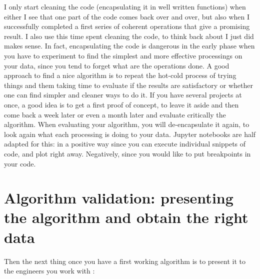 \documentclass[24pt]{article}
\begin{document}
I only start cleaning the code (encapsulating it in well written functions) when either I see that one part of the code comes back over and over, but also when I successfully completed a first series of coherent operations that give a promising result. I also use this time spent cleaning the code, to think back about I just did makes sense. In fact,  encapsulating the code is dangerous in the early phase when you have to experiment to find the simplest and more effective processings on your data, since you tend to forget what are the operations done. A good approach to find a nice algorithm is to repeat the hot-cold process of trying things and them taking time to evaluate if the results are satisfactory or whether one can find simpler and cleaner ways to do it. If you have several projects at once, a good idea is to get a first proof of concept, to leave it aside and then come back a week later or even a month later and evaluate critically the algorithm. When evaluating your algorithm, you will de-encapsulate it again, to look again what each processing is doing to your data. Jupyter notebooks are half adapted for this: in a positive way since you can execute individual snippets of code, and plot right away. Negatively, since you would like to put breakpoints in your code.

 
 

\section{Algorithm validation: presenting the algorithm and obtain the right data}
  

  
 
Then the next thing once you have a  first working algorithm is to present it to the engineers you work with :
\end{document}
